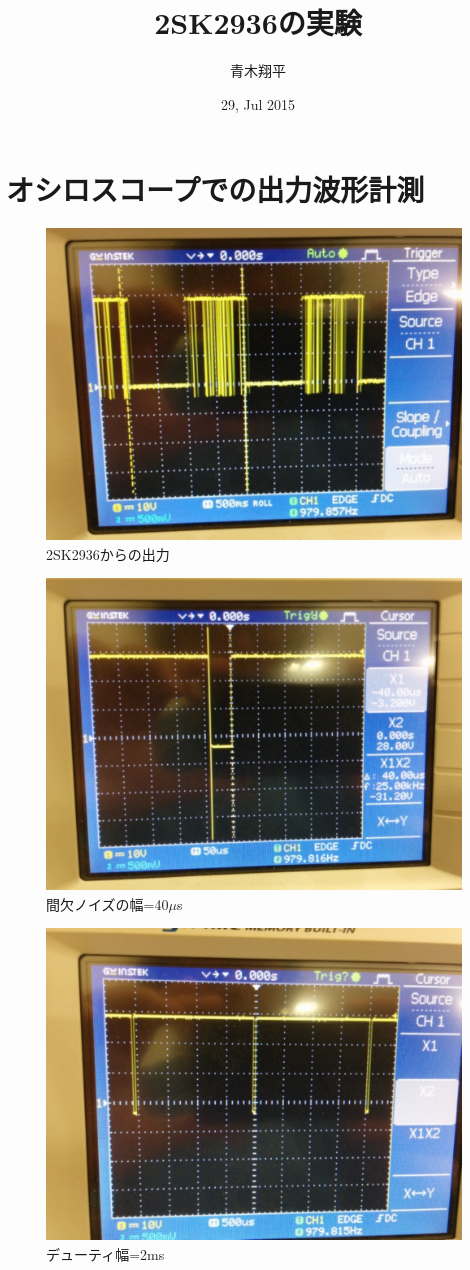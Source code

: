 \documentclass[]{jsarticle}
\begin{document}
\title{2SK2936の実験}
\author{青木翔平}
\date{29, Jul 2015}
\maketitle

\section{オシロスコープでの出力波形計測}


\begin{figure}[htbp]
\centering
\includegraphics[width=110mm]{./image/out.pdf}
\caption{2SK2936からの出力}
\label{output}
\end{figure}

\begin{figure}[htbp]
\centering
\includegraphics[width=110mm]{./image/short.pdf}
\caption{間欠ノイズの幅=40$\mu$s}
\label{short}
\end{figure}

\begin{figure}[htbp]
\centering
\includegraphics[width=110mm]{./image/long.pdf}
\caption{デューティ幅=2ms}
\label{long}
\end{figure}
\end{document}
